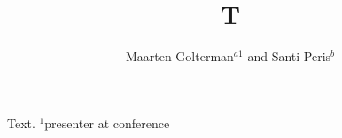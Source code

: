 \documentclass{ws-p8-50x6-00}
\begin{document}
\title{T}
\author{Maarten Golterman$^{a1}$ and Santi Peris$^b$}
\address{{}$^a$Department of Physics, Washington University, St. Louis MO 63130, USA\\E-mail: maarten@aapje.wustl.edu\\
{}$^b$IFAE, Univ. Autonoma de Barcelona, Spain\\E-mail: peris@ifae.es}
\maketitle
Text. {\footnotesize {}$^1$presenter at conference}
\end{document}
